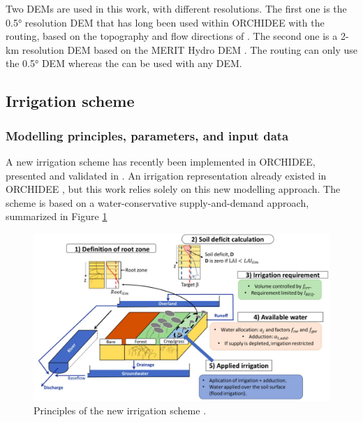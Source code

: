 Two DEMs are used in this work, with different resolutions. 
The first one is the 0.5° resolution DEM that has long been used within ORCHIDEE with the \std routing, based on the topography and flow directions of \citet{vorosmarty_geomorphometric_2000}.
The second one is a 2-km resolution DEM based on the MERIT Hydro DEM \citep{yamazaki_merit_2019}.
The \std routing can only use the 0.5° DEM whereas the \native can be used with any DEM.


\subsection{Irrigation scheme}
\subsubsection{Modelling principles, parameters, and input data}
A new irrigation scheme has recently been implemented in ORCHIDEE, presented and validated in \citet{arboleda-obando_validation_2024}. An irrigation representation already existed in ORCHIDEE \citep{de_rosnay_integrated_2003, guimberteau_global_2012}, but this work relies solely on this new modelling approach. The scheme is based on a water-conservative supply-and-demand approach, summarized in Figure \ref{fig:schema_pedro}

\begin{figure}[t]
    \centering
    \includegraphics[width=1\textwidth]{images/methods/schema_pedro.png}
    \caption{Principles of the new irrigation scheme \citep[from][]{arboleda-obando_validation_2024}.}
    \label{fig:schema_pedro}
\end{figure}


